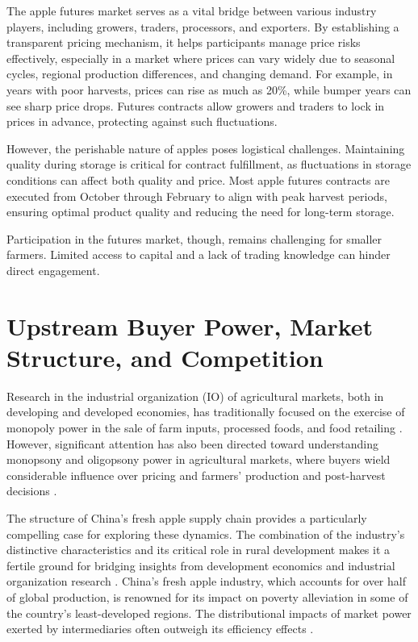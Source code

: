 The apple futures market serves as a vital bridge between various industry players, including growers, traders, processors, and exporters. By establishing a transparent pricing mechanism, it helps participants manage price risks effectively, especially in a market where prices can vary widely due to seasonal cycles, regional production differences, and changing demand. For example, in years with poor harvests, prices can rise as much as 20\%, while bumper years can see sharp price drops. Futures contracts allow growers and traders to lock in prices in advance, protecting against such fluctuations.

However, the perishable nature of apples poses logistical challenges. Maintaining quality during storage is critical for contract fulfillment, as fluctuations in storage conditions can affect both quality and price. Most apple futures contracts are executed from October through February to align with peak harvest periods, ensuring optimal product quality and reducing the need for long-term storage. 

Participation in the futures market, though, remains challenging for smaller farmers. Limited access to capital and a lack of trading knowledge can hinder direct engagement. 




\section{Upstream Buyer Power, Market Structure, and Competition \label{Section: market structure}}
\noindent 
Research in the industrial organization (IO) of agricultural markets, both in developing and developed economies, has traditionally focused on the exercise of monopoly power in the sale of farm inputs, processed foods, and food retailing \citep{macdonald2024introduction}. However, significant attention has also been directed toward understanding monopsony and oligopsony power in agricultural markets, where buyers wield considerable influence over pricing and farmers' production and post-harvest decisions \citep{kopp2021farmers, zavala2024unfair}.

The structure of China's fresh apple supply chain provides a particularly compelling case for exploring these dynamics. The combination of the industry's distinctive characteristics and its critical role in rural development makes it a fertile ground for bridging insights from development economics and industrial organization research \citep{bellemare2022agricultural}. China's fresh apple industry, which accounts for over half of global production, is renowned for its impact on poverty alleviation in some of the country's least-developed regions. The distributional impacts of market power exerted by intermediaries often outweigh its efficiency effects \citep{sexton2013market}.

